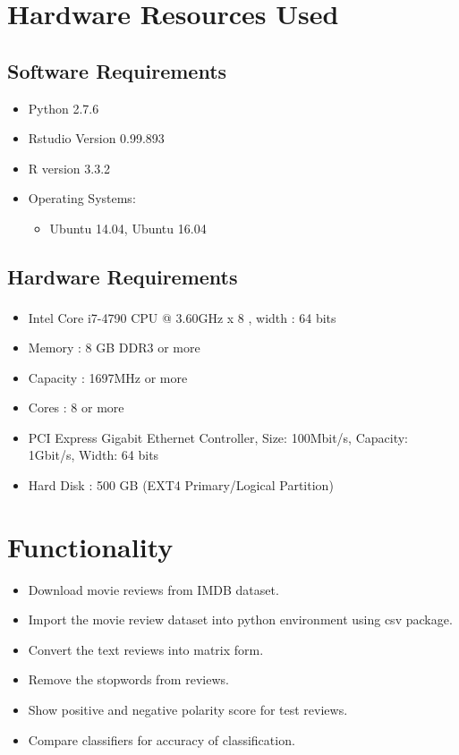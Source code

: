 \documentclass[oneside,a4paper,12pt]{pictreport}
\begin{document}
\section{Hardware Resources Used}
\subsection{Software Requirements}
\begin{itemize}
				\item Python 2.7.6 
				\item Rstudio Version 0.99.893 
				\item R version 3.3.2
				\item Operating Systems:
					\begin{itemize}
						
						\item Ubuntu 14.04, Ubuntu 16.04
						
					\end{itemize}
\end{itemize}
\subsection{Hardware Requirements}
			\begin{itemize}
				\item Intel\textsuperscript{\textregistered} Core\textsuperscript{\texttrademark} i7-4790 CPU @ 3.60GHz x 8 , width : 64 bits
				\item Memory : 8 GB DDR3 or more
				\item Capacity : 1697MHz or more
				\item Cores : 8 or more
				\item PCI Express Gigabit Ethernet Controller, Size: 100Mbit/s, Capacity: 1Gbit/s, Width: 64 bits
				\item Hard Disk : 500 GB (EXT4 Primary/Logical Partition)
			\end{itemize}
		
\newpage

\section{Functionality}
\begin{itemize}
\item Download movie reviews from IMDB dataset.
\item Import the movie review dataset into python environment using csv package.

\item Convert the text reviews into matrix form.
\item Remove the stopwords from reviews.
\item Show positive and negative polarity score for test reviews.


\item Compare classifiers for accuracy of classification.
\end{itemize} 
\end{document}
